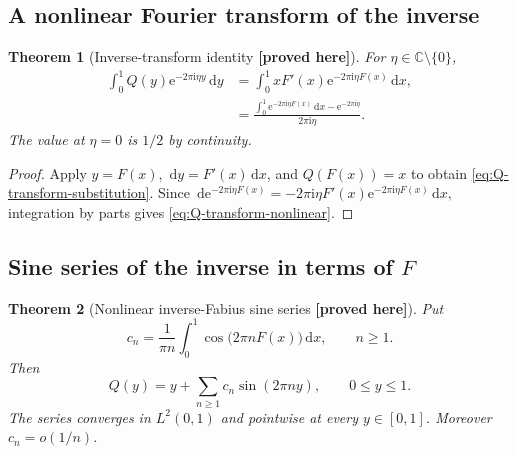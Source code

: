\documentclass[11pt,oneside]{article}
\newtheorem{theorem}{Theorem}[section]
\theoremstyle{definition}
\theoremstyle{remark}
\newcommand{\C}{\mathbb C}
\newcommand{\e}{\mathrm e}
\newcommand{\ii}{\mathrm i}
\newcommand{\dd}{\,\mathrm d}
\newcommand{\smallo}{o}
\newcommand{\New}{\textcolor{amber}{\textbf{[proved here]}}}
\begin{document}
\subsection{A nonlinear Fourier transform of the inverse}

\begin{theorem}[Inverse-transform identity \New]
For $\eta\in\C\setminus\{0\}$,
\begin{align}
 \int_0^1Q(y)\e^{-2\pi\ii\eta y}\dd y
 &=\int_0^1xF'(x)\e^{-2\pi\ii\eta F(x)}\dd x,            \label{eq:Q-transform-substitution}\\
 &=\frac{\displaystyle\int_0^1\e^{-2\pi\ii\eta F(x)}\dd x
       -\e^{-2\pi\ii\eta}}
 {2\pi\ii\eta}.                                        \label{eq:Q-transform-nonlinear}
\end{align}
The value at $\eta=0$ is $1/2$ by continuity.
\end{theorem}

\begin{proof}
Apply $y=F(x)$, $\dd y=F'(x)\dd x$, and $Q(F(x))=x$ to obtain
\eqref{eq:Q-transform-substitution}.  Since
\(
 \dd\e^{-2\pi\ii\eta F(x)}
 =-2\pi\ii\eta F'(x)\e^{-2\pi\ii\eta F(x)}\dd x,
\)
integration by parts gives \eqref{eq:Q-transform-nonlinear}.
\end{proof}

\subsection{Sine series of the inverse in terms of \texorpdfstring{$F$}{F}}

\begin{theorem}[Nonlinear inverse-Fabius sine series \New]
Put
\begin{equation}
 c_n=\frac{1}{\pi n}\int_0^1\cos\bigl(2\pi nF(x)\bigr)\dd x,
 \qquad n\ge1.                                           \label{eq:Q-sine-coeff}
\end{equation}
Then
\begin{equation}
 \boxed{\quad
 Q(y)=y+\sum_{n\ge1}c_n\sin(2\pi ny),
 \qquad 0\le y\le1.
 \quad}                                                  \label{eq:Q-sine-series}
\end{equation}
The series converges in $L^2(0,1)$ and pointwise at every $y\in[0,1]$.  Moreover
$c_n=\smallo(1/n)$.
\end{theorem}
\end{document}
